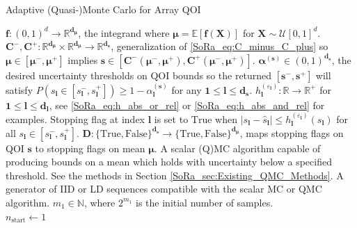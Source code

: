 \documentclass[graybox]{svmult}
\begin{document}
\begin{algorithm}[t]
    \caption{Adaptive (Quasi-)Monte Carlo for Array QOI}
    \label{SoRa_algo:MCStoppingCriterion}
    \begin{algorithmic}
    \Require $\boldsymbol{f}: (0,1)^d \to \mathbb{R}^{\boldsymbol{d}_{\boldsymbol{\mu}}}$, the integrand where $\boldsymbol{\mu} = \mathbb{E}[\boldsymbol{f}(\boldsymbol{X})]$ for $\boldsymbol{X} \sim \mathcal{U}[0,1]^d$.
    \Require $\boldsymbol{C}^-,\boldsymbol{C}^+: \mathbb{R}^{\boldsymbol{d}_{\boldsymbol{\mu}}} \times \mathbb{R}^{\boldsymbol{d}_{\boldsymbol{\mu}}} \to \mathbb{R}^{\boldsymbol{d}_{\boldsymbol{s}}}$, generalization of \eqref{SoRa_eq:C_minus_C_plus} so $\boldsymbol{\mu} \in [\boldsymbol{\mu}^-,\boldsymbol{\mu}^+]$ implies $\boldsymbol{s} \in [\boldsymbol{C}^-(\boldsymbol{\mu}^-,\boldsymbol{\mu}^+),\boldsymbol{C}^+(\boldsymbol{\mu}^-,\boldsymbol{\mu}^+)]$.
    \Require $\boldsymbol{\alpha}^{(\boldsymbol{s})} \in (0,1)^{\boldsymbol{d}_{\boldsymbol{s}}}$, the desired uncertainty thresholds on QOI bounds so the returned $[\boldsymbol{s}^-,\boldsymbol{s}^+]$ will satisfy $P(s_{\boldsymbol{l}} \in [s_{\boldsymbol{l}}^-,s_{\boldsymbol{l}}^+]) \geq 1-\alpha^{(\boldsymbol{s})}_{\boldsymbol{l}}$ for any $\boldsymbol{1} \leq \boldsymbol{l} \leq \boldsymbol{d}_{\boldsymbol{s}}$.
    \Require $h^{(\varepsilon_{\boldsymbol{l}})}_{\boldsymbol{l}}: \mathbb{R} \to \mathbb{R}^+$ for $\boldsymbol{1} \leq \boldsymbol{l} \leq \boldsymbol{d}_{\boldsymbol{l}}$, see \eqref{SoRa_eq:h_abs_or_rel} or \eqref{SoRa_eq:h_abs_and_rel} for examples. Stopping flag at index $\boldsymbol{l}$ is set to $\text{True}$ when $\lvert s_{\boldsymbol{l}} - \hat{s}_{\boldsymbol{l}} \rvert \leq h^{(\varepsilon_{\boldsymbol{l}})}_{\boldsymbol{l}}(s_{\boldsymbol{l}})$ for all $s_{\boldsymbol{l}} \in [s_{\boldsymbol{l}}^-,s_{\boldsymbol{l}}^+]$.
    \Require $\boldsymbol{D}: \{\text{True},\text{False}\}^{\boldsymbol{d}_{\boldsymbol{s}}} \to \{\text{True},\text{False}\}^{\boldsymbol{d}_{\boldsymbol{\mu}}}$, maps stopping flags on QOI $\boldsymbol{s}$ to stopping flags on mean $\boldsymbol{\mu}$. 
    \Require A scalar (Q)MC algorithm capable of producing bounds on a mean which holds with uncertainty below a specified threshold. See the methods in Section \ref{SoRa_sec:Existing_QMC_Methods}.
    \Require A generator of IID or LD sequences compatible with the scalar MC or QMC algorithm. 
    \Require $m_1 \in \mathbb{N}$, where $2^{m_1}$ is the initial number of samples.
    \\ \hrulefill
    \State $n_\text{start} \gets 1$ 

\end{algorithmic}
\end{algorithm}
\end{document}
